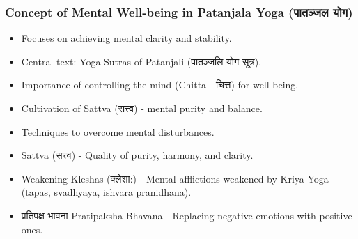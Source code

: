 \begin{frame}[fragile]\frametitle{Concept of Mental Well-being in Patanjala Yoga (पातञ्जल योग)}

      \begin{itemize}
		\item Focuses on achieving mental clarity and stability.
		\item Central text: Yoga Sutras of Patanjali (पातञ्जलि योग सूत्र).
		\item Importance of controlling the mind (Chitta - चित्त) for well-being.
		\item Cultivation of Sattva (सत्त्व) - mental purity and balance.
		\item Techniques to overcome mental disturbances.
		\item Sattva (सत्त्व) - Quality of purity, harmony, and clarity.
		\item Weakening Kleshas (क्लेशा:) - Mental afflictions weakened by Kriya Yoga (tapas, svadhyaya, ishvara pranidhana).
		\item प्रतिपक्ष भावना Pratipaksha Bhavana - Replacing negative emotions with positive ones.		
	  \end{itemize}

\end{frame}

